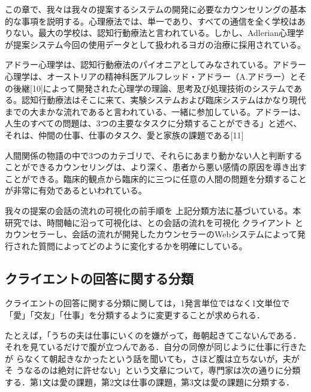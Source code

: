 \documentclass[shuuron]{kuee}
\begin{document}

 この章で、我々は我々の提案するシステムの開発に必要なカウンセリングの基本的な事項を説明する。心理療法では、単一であり、すべての通信を全く学校はありない。最大の学校は、認知行動療法と言われている。しかし、Adlerian心理学が提案システム今回の使用データとして扱われるヨガの治療に採用されている。

アドラー心理学は、認知行動療法のパイオニアとしてみなされている。アドラー心理学は、オーストリアの精神科医アルフレッド・アドラー（A.アドラー）とその後継[10]によって開発された心理学の理論、思考及び処理技術のシステムである。認知行動療法はそこに来て、実験システムおよび臨床システムはかなり現代までの大まかな流れであると言われている、一緒に参加している。アドラーは、人生のすべての問題は、3つの主要なタスクに分類することができる」と述べ、それは、仲間の仕事、仕事のタスク、愛と家族の課題である[11]


人間関係の物語の中で3つのカテゴリで、それらにあまり動かない人と判断することができるカウンセリングは、より深く、患者から悪い感情の原因を導き出すことができる。臨床的観点から臨床的に三つに任意の人間の問題を分類することが非常に有効であるといわれている。

我々の提案の会話の流れの可視化の前手順を 上記分類方法に基づいている。本研究では、時間軸に沿って可視化は、との会話の流れを可視化 クライアント とカウンセラーし、会話の流れが開発したカウンセラーのWebシステムによって発行された質問によってどのように変化するかを明確にしている。


\subsection{クライエントの回答に関する分類}



クライエントの回答に関する分類に関しては，1発言単位ではなく1文単位で「愛」「交友」「仕事」を分類するように変更することが求められる．

たとえば，「うちの夫は仕事にいくのを嫌がって，毎朝起きてこないんである．
それを見ているだけで腹が立つんである．自分の同僚が同じように仕事に行きたが
らなくて朝起きなかったという話を聞いても，さほど腹は立ちないが，夫がそ
うなるのは絶対に許せない」という文章について，専門家は次の通りに分類する．第1文は愛の課題，第2文は仕事の課題，第3文は愛の課題に分類する．
\end{document}
